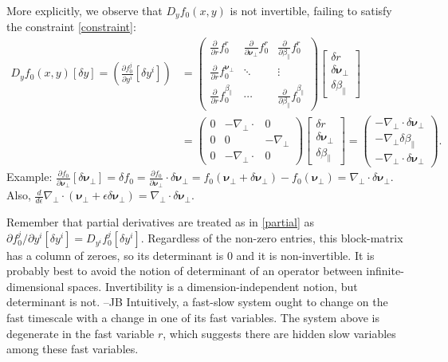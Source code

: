 \documentclass{article}
\newcommand{\para}{\parallel}
\newcommand{\ep}{\epsilon}
\newcommand{\np}{\nabla_\perp}
\newcommand{\p}{\partial}
\newcommand{\deriv}[2]{\frac{\p #1}{\p #2}}
\newcommand{\pth} [1] {\left( #1 \right) }
\newcommand{\br} [1] {\left[ #1 \right] }
\newcommand{\bmat} [1] {\begin{bmatrix} #1 \end{bmatrix}}
\newcommand{\pmat} [1] {\begin{pmatrix} #1 \end{pmatrix}}
\begin{document}
More explicitly, we observe that $D_yf_0(x,y)$ is not invertible, failing to satisfy the constraint \eqref{constraint}:
\begin{equation} \begin{split}
    D_yf_0(x,y) [\delta y] = \pth{\deriv{f_0^j}{y^i} \br{\delta y^i}} 
    &= \pmat{\deriv{}{r}f_0^r & \deriv{}{\bm{\nu}_\perp}f_0^r & \deriv{}{\beta_\para}f_0^r\\ \deriv{}{r}f_0^{\bm{\nu}_\perp} & \ddots & \vdots \\ \deriv{}{r}f_0^{\beta_\para} & \cdots & \deriv{}{\beta_\para}f_0^{\beta_\para}} 
    \bmat{\delta r \\ \delta \bm{\nu}_\perp \\ \delta \beta_\para} \\
    &= \pmat{0 & -\np \cdot & 0 \\ 0 & 0 & -\np \\ 0 & -\np \cdot & 0} 
    \bmat{\delta r \\ \delta \bm{\nu}_\perp \\ \delta \beta_\para}
    = \pmat{-\np \cdot \delta \bm{\nu}_\perp \\ -\np \delta \beta_\para \\ -\np \cdot \delta \bm{\nu}_\perp }.
\end{split} \end{equation}
Example: $\deriv{f_0}{\bm{\nu}_\perp}[\delta\bm{\nu}_\perp] = \delta f_0 = \deriv{f_0}{\bm{\nu}_\perp}\cdot \delta\bm{\nu}_\perp = f_0(\bm{\nu}_\perp+ \delta\bm{\nu}_\perp) - f_0(\bm{\nu}_\perp) = \np\cdot \delta\bm{\nu}_\perp$. Also, $\frac{d}{d\ep}\np\cdot\pth{\bm{\nu}_\perp+\ep\delta\bm{\nu}_\perp} = \np\cdot\delta\bm{\nu}_\perp$.

Remember that partial derivatives are treated as in \eqref{partial} as $\p f_0^j/\p y^i \br{\delta y^i} = D_{y^i} f_0^j \br{\delta y^i}$. Regardless of the non-zero entries, this block-matrix has a column of zeroes, so its determinant is $0$ and it is non-invertible. {\color{red}It is probably best to avoid the notion of determinant of an operator between infinite-dimensional spaces. Invertibility is a dimension-independent notion, but determinant is not. --JB} Intuitively, a fast-slow system ought to change on the fast timescale with a change in one of its fast variables. The system above is degenerate in the fast variable $r$, which suggests there are hidden slow variables among these fast variables. 
\end{document}
